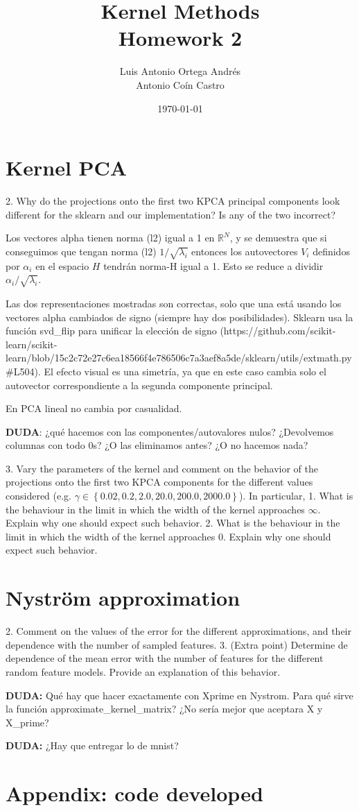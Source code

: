 \documentclass[11pt]{article}
\author{Luis Antonio Ortega Andrés\\Antonio Coín Castro}
\date{\today}
\title{Kernel Methods\\\medskip
\large Homework 2}
\begin{document}
\maketitle

\section{Kernel PCA}

2. Why do the projections onto the first two KPCA principal components look different for the sklearn and our implementation? Is any of the two incorrect?

Los vectores alpha tienen norma (l2) igual a 1 en $\mathbb R^N$, y se demuestra que si conseguimos que tengan norma (l2) $1/\sqrt{\lambda_i}$ entonces los autovectores $V_i$ definidos por $\alpha_i$ en el espacio $H$ tendrán norma-H igual a 1. Esto se reduce a dividir $\alpha_i/\sqrt{\lambda_i}$.

Las dos representaciones mostradas son correctas, solo que una está usando los vectores alpha cambiados de signo (siempre hay dos posibilidades). Sklearn usa la función svd_flip para unificar la elección de signo (https://github.com/scikit-learn/scikit-learn/blob/15c2c72e27c6ea18566f4e786506c7a3aef8a5de/sklearn/utils/extmath.py#L504). El efecto visual es una simetría, ya que en este caso cambia solo el autovector correspondiente a la segunda componente principal.

En PCA lineal no cambia por casualidad.

\textbf{DUDA}: ¿qué hacemos con las componentes/autovalores nulos? ¿Devolvemos columnas con todo 0s? ¿O las eliminamos antes? ¿O no hacemos nada?

3. Vary the parameters of the kernel and comment on the behavior of the projections onto the first two KPCA components for the different values considered (e.g. $\gamma \in \left\{0.02, 0.2, 2.0, 20.0, 200.0, 2000.0\right\}$). In particular,
    1. What is the behaviour in the limit in which the width of the kernel approaches $\infty$. Explain why one should expect such behavior.
    2. What is the behaviour in the limit in which the width of the kernel approaches $0$. Explain why one should expect such behavior.

\section{Nyström approximation}

2. Comment on the values of the error for the different approximations, and their dependence with the number of sampled features.
3. (Extra point) Determine de dependence of the mean error with the number of features for the different random feature models. Provide an explanation of this behavior.

\textbf{DUDA:} Qué hay que hacer exactamente con Xprime en Nystrom. Para qué sirve la función approximate_kernel_matrix? ¿No sería mejor que aceptara X y X_prime?

\textbf{DUDA:} ¿Hay que entregar lo de mnist?

\section*{Appendix: code developed}
\end{document}
